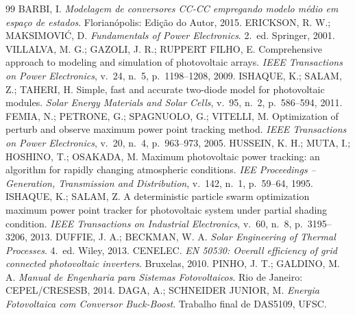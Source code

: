 \documentclass[11pt,a4paper]{article}
\begin{document}
\begin{thebibliography}{99}\small
{} BARBI, I. \emph{Modelagem de conversores CC-CC empregando modelo médio em
espaço de estados}. Florianópolis: Edição do Autor, 2015.
 ERICKSON, R. W.; MAKSIMOVIĆ, D. \emph{Fundamentals of Power Electronics}.
2.\ ed. Springer, 2001.
 VILLALVA, M. G.; GAZOLI, J. R.; RUPPERT FILHO, E. Comprehensive approach to
modeling and simulation of photovoltaic arrays. \emph{IEEE Transactions on Power Electronics},
v.\ 24, n.\ 5, p.\ 1198--1208, 2009.
 ISHAQUE, K.; SALAM, Z.; TAHERI, H. Simple, fast and accurate two-diode
model for photovoltaic modules. \emph{Solar Energy Materials and Solar Cells}, v.\ 95, n.\ 2,
p.\ 586--594, 2011.
 FEMIA, N.; PETRONE, G.; SPAGNUOLO, G.; VITELLI, M. Optimization of perturb
and observe maximum power point tracking method. \emph{IEEE Transactions on Power Electronics},
v.\ 20, n.\ 4, p.\ 963--973, 2005.
 HUSSEIN, K. H.; MUTA, I.; HOSHINO, T.; OSAKADA, M. Maximum photovoltaic
power tracking: an algorithm for rapidly changing atmospheric conditions. \emph{IEE
Proceedings -- Generation, Transmission and Distribution}, v.\ 142, n.\ 1, p.\ 59--64, 1995.
 ISHAQUE, K.; SALAM, Z. A deterministic particle swarm optimization
maximum power point tracker for photovoltaic system under partial shading condition.
\emph{IEEE Transactions on Industrial Electronics}, v.\ 60, n.\ 8, p.\ 3195--3206, 2013.
 DUFFIE, J. A.; BECKMAN, W. A. \emph{Solar Engineering of Thermal Processes}.
4.\ ed. Wiley, 2013.
 CENELEC. \emph{EN 50530: Overall efficiency of grid connected photovoltaic
inverters}. Bruxelas, 2010.
 PINHO, J. T.; GALDINO, M. A. \emph{Manual de Engenharia para Sistemas
Fotovoltaicos}. Rio de Janeiro: CEPEL/CRESESB, 2014.
 DAGA, A.; SCHNEIDER JUNIOR, M. \emph{Energia Fotovoltaica com Conversor
Buck-Boost}. Trabalho final de DAS5109, UFSC.
\end{thebibliography}
\end{document}
